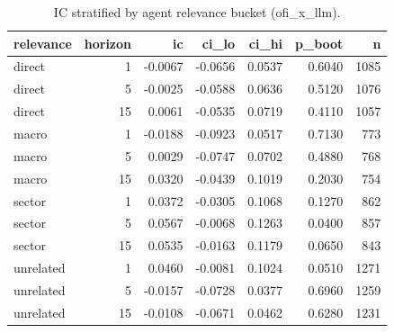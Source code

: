 \begin{table}[htbp]
\centering
\caption{IC stratified by agent relevance bucket (ofi\_x\_llm).}
\label{tab:relevance_ic}
\begin{tabular}{lrrrrrr}
\toprule
relevance & horizon & ic & ci\_lo & ci\_hi & p\_boot & n \\
\midrule
direct & 1 & -0.0067 & -0.0656 & 0.0537 & 0.6040 & 1085 \\
direct & 5 & -0.0025 & -0.0588 & 0.0636 & 0.5120 & 1076 \\
direct & 15 & 0.0061 & -0.0535 & 0.0719 & 0.4110 & 1057 \\
macro & 1 & -0.0188 & -0.0923 & 0.0517 & 0.7130 & 773 \\
macro & 5 & 0.0029 & -0.0747 & 0.0702 & 0.4880 & 768 \\
macro & 15 & 0.0320 & -0.0439 & 0.1019 & 0.2030 & 754 \\
sector & 1 & 0.0372 & -0.0305 & 0.1068 & 0.1270 & 862 \\
sector & 5 & 0.0567 & -0.0068 & 0.1263 & 0.0400 & 857 \\
sector & 15 & 0.0535 & -0.0163 & 0.1179 & 0.0650 & 843 \\
unrelated & 1 & 0.0460 & -0.0081 & 0.1024 & 0.0510 & 1271 \\
unrelated & 5 & -0.0157 & -0.0728 & 0.0377 & 0.6960 & 1259 \\
unrelated & 15 & -0.0108 & -0.0671 & 0.0462 & 0.6280 & 1231 \\
\bottomrule
\end{tabular}
\end{table}
